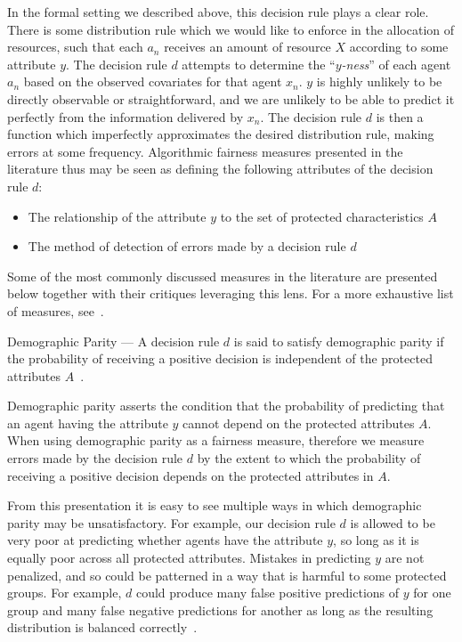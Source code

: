 In the formal setting we described above, this decision rule plays a clear role.
There is some distribution rule which we would like to enforce in the allocation
of resources, such that each $a_n$ receives an amount of resource $X$ according
to some attribute $y$. The decision rule $d$ attempts to determine the
``\textit{$y$-ness}'' of each agent $a_n$ based on the observed covariates for
that agent $x_n$. $y$ is highly unlikely to be directly observable or
straightforward, and we are unlikely to be able to predict it perfectly from the
information delivered by $x_n$. The decision rule $d$ is then a function which
imperfectly approximates the desired distribution rule, making errors at some 
frequency. Algorithmic fairness measures presented in the literature thus may
be seen as defining the following attributes of the decision rule $d$:
\begin{itemize}
    \item The relationship of the attribute $y$ to the set of protected
          characteristics $A$
    \item The method of detection of errors made by a decision rule $d$
\end{itemize}

Some of the most commonly discussed measures in the literature are presented
below together with their critiques leveraging this lens. For a more exhaustive
list of measures, see~\cite{CorbettDavies_2023}.

\begin{definition} Demographic Parity — A decision rule $d$ is said to satisfy
demographic parity if the probability of receiving a positive decision is
independent of the protected attributes $A$~\cite{Dwork_2012}. \end{definition}

Demographic parity asserts the condition that the probability of predicting that
an agent having the attribute $y$ cannot depend on the protected attributes $A$. 
When using demographic parity as a fairness measure, therefore we measure
errors made by the decision rule $d$ by the extent to which the probability of
receiving a positive decision depends on the protected attributes in $A$.

From this presentation it is easy to see multiple ways in which demographic
parity may be unsatisfactory. For example, our decision rule $d$ is allowed to
be very poor at predicting whether agents have the attribute $y$, so long as it
is equally poor across all protected attributes. Mistakes in predicting $y$ are
not penalized, and so could be patterned in a way that is harmful to some
protected groups. For example, $d$ could produce many false positive predictions
of $y$ for one group and many false negative predictions for another as long as
the resulting distribution is balanced correctly~\cite{Barocas_2017}.

